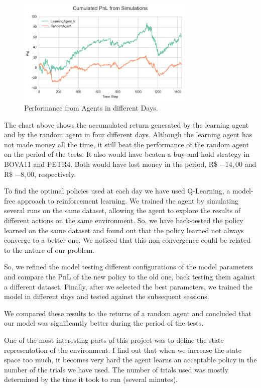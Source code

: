 \documentclass[a4paper]{article}
\begin{document}
\begin{figure}[ht]
\centering
\includegraphics[width=0.75\textwidth]{figures/optm_rand_several_days.png}
\caption{\label{fig:optm_rand_several_days}Performance from Agents in different Days.}
\end{figure}

The chart above shows the accumulated return generated by the learning agent and by the random agent in four different days. Although the learning agent has not made money all the time, it still beat the performance of the random agent on the period of the tests. It also would have beaten a buy-and-hold strategy in BOVA11 and PETR4. Both would have lost money in the period, R\$ $-14,00$ and R\$ $-8,00$, respectively.

To find the optimal policies used at each day we have used Q-Learning, a model-free approach to reinforcement learning. We trained the agent by simulating several runs on the same dataset, allowing the agent to explore the results of different actions on the same environment. So, we have back-tested the policy learned on the same dataset and found out that the policy learned not always converge to a better one. We noticed that this non-convergence could be related to the nature of our problem.

So, we refined the model testing different configurations of the model parameters and compare the PnL of the new policy to the old one, back testing them against a different dataset. Finally, after we selected the best parameters, we trained the model in different days and tested against the subsequent sessions.

We compared these results to the returns of a random agent and concluded that our model was significantly better during the period of the tests.

One of the most interesting parts of this project was to define the state representation of the environment. I find out that when we increase the state space too much, it becomes very hard the agent learns an acceptable policy in the number of the trials we have used. The number of trials used was mostly determined by the time it took to run (several minutes).
\end{document}

